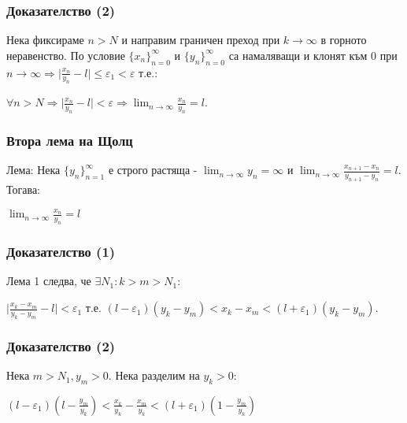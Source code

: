 \documentclass[12pt]{beamer}
\begin{document}
\begin{frame}
\frametitle{Доказателство (2)}
\begin{block}
{}
Нека фиксираме \(n > N\) и направим граничен преход при \(k \to \infty\) в горното неравенство. По условие \(\{x_n\}_{n=0}^\infty\) и \(\{y_n\}_{n=0}^\infty\) са намаляващи и клонят към 0 при \(\displaystyle n \to \infty \Rightarrow \lvert\frac{x_n}{y_n} - l\rvert \leq \varepsilon_1 < \varepsilon\) т.е.:
\begin{center}
\(\displaystyle\forall n > N \Rightarrow \lvert \frac{x_n}{y_n} - l \rvert < \varepsilon \Rightarrow \lim_{n \to \infty}\frac{x_n}{y_n} = l\).
\end{center}
\end{block}
\end{frame}

\begin{frame}
\frametitle{Втора лема на Щолц}
\begin{block}
{Лема:}
Нека \(\{y_n\}_{n=1}^\infty\) е строго растяща - \(\displaystyle\lim_{n \to \infty}y_n = \infty\) и \(\displaystyle\lim_{n \to \infty}\frac{x_{n+1} - x_n}{y_{n+1} - y_n} = l\). Тогава:
\begin{center}
\(\displaystyle\lim_{n \to \infty}\frac{x_n}{y_n} = l\)
\end{center}
\end{block}
\end{frame}

\begin{frame}
\frametitle{Доказателство (1)}
\begin{block}
{}
Лема 1 следва, че \(\exists N_1 : k > m > N_1:\)
\begin{center}
\(
    \displaystyle\lvert\frac{x_k - x_m}{y_k - y_m} - l\rvert < \varepsilon_1
\)
т.е. \((l - \varepsilon_1)(y_k - y_m) < x_k - x_m < (l + \varepsilon_1)(y_k - y_m)\).
\end{center}
\end{block}
\end{frame}

\begin{frame}
\frametitle{Доказателство (2)}
\begin{block}
{}
Нека \(m > N_1, y_m > 0\). Нека разделим на \(y_k > 0\):
\begin{center}
\(\displaystyle(l - \varepsilon_1)(l - \frac{y_m}{y_k}) < \frac{x_k}{y_k} - \frac{x_m}{y_k} < (l + \varepsilon_1)(1 - \frac{y_m}{y_k})\)
\end{center}
\end{block}
\end{frame}
\end{document}
